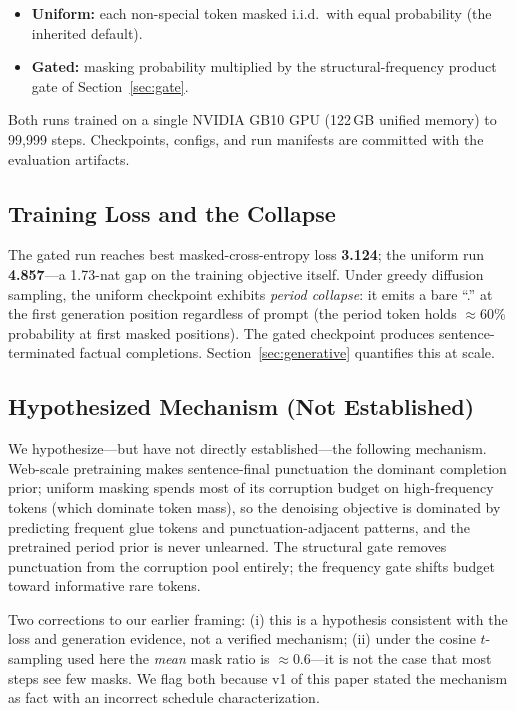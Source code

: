\documentclass{article}
\begin{document}
\begin{itemize}
    \item \textbf{Uniform:} each non-special token masked i.i.d.\ with equal
    probability (the inherited default).
    \item \textbf{Gated:} masking probability multiplied by the
    structural-frequency product gate of Section~\ref{sec:gate}.
\end{itemize}

Both runs trained on a single NVIDIA GB10 GPU (122\,GB unified memory) to 99{,}999
steps. Checkpoints, configs, and run manifests are committed with the evaluation
artifacts.

\subsection{Training Loss and the Collapse}

The gated run reaches best masked-cross-entropy loss \textbf{3.124}; the uniform run
\textbf{4.857}---a 1.73-nat gap on the training objective itself. Under greedy
diffusion sampling, the uniform checkpoint exhibits \emph{period collapse}: it emits a
bare ``.'' at the first generation position regardless of prompt (the period token
holds $\approx$60\% probability at first masked positions). The gated checkpoint
produces sentence-terminated factual completions. Section~\ref{sec:generative}
quantifies this at scale.

\subsection{Hypothesized Mechanism (Not Established)}
\label{sec:hypothesis}

We hypothesize---but have not directly established---the following mechanism. Web-scale
pretraining makes sentence-final punctuation the dominant completion prior; uniform
masking spends most of its corruption budget on high-frequency tokens (which dominate
token mass), so the denoising objective is dominated by predicting frequent glue
tokens and punctuation-adjacent patterns, and the pretrained period prior is never
unlearned. The structural gate removes punctuation from the corruption pool entirely;
the frequency gate shifts budget toward informative rare tokens.

Two corrections to our earlier framing: (i) this is a hypothesis consistent with the
loss and generation evidence, not a verified mechanism; (ii) under the cosine
$t$-sampling used here the \emph{mean} mask ratio is $\approx 0.6$---it is not the case
that most steps see few masks. We flag both because v1 of this paper stated the
mechanism as fact with an incorrect schedule characterization.
\end{document}
